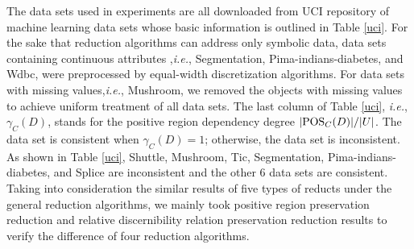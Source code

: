 \documentclass[review]{elsarticle}
\begin{document}
	\par The data sets used in experiments are all downloaded from UCI repository of machine learning data sets \cite{Dua:2019} whose basic information is outlined in Table \ref{uci}. For the sake that reduction algorithms can address only symbolic data, data sets containing continuous attributes ,\emph{i.e.}, Segmentation, Pima-indians-diabetes, and Wdbc, were preprocessed by equal-width discretization algorithms. For data sets with missing values,\emph{i.e.}, Mushroom,  we removed the objects with missing values to achieve uniform treatment of all data sets. The last column of Table \ref{uci}, \emph{i.e.}, $\gamma_C(D)$, stands for the positive region dependency degree $|{\rm POS}_C(D)|/|U|$. The data set is consistent when $\gamma_C(D)=1$; otherwise, the data set is inconsistent. As shown in Table \ref{uci}, Shuttle, Mushroom, Tic, Segmentation, Pima-indians-diabetes, and Splice are inconsistent and the other 6 data sets are consistent. Taking into consideration the similar results of five types of reducts under the general reduction algorithms, we mainly took positive region preservation reduction and relative discernibility relation preservation reduction results to verify the difference of four reduction algorithms.
\end{document}
